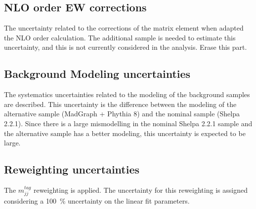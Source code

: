 \color{blue}
{
\subsection{NLO order EW corrections}
The uncertainty related to the corrections of the matrix element when adapted the NLO order calculation. The additional sample is needed to estimate this uncertainty, and this is not currently considered in the analysis. Erase this part.
}

\color{black}
\subsection{Background Modeling uncertainties}
The systematics uncertainties related to the modeling of the background samples are described. This uncertainty is the difference between the modeling of the alternative sample (MadGraph + Phythia 8)  and the nominal sample (Shelpa 2.2.1). Since there is a large mismodelling in the nominal Shelpa 2.2.1 sample and the alternative sample has a better modeling, this uncertainty is expected to be large.
\subsection{Reweighting uncertainties}
The $m^{tag}_{jj}$ reweighting is applied. The uncertainty for this reweighting is assigned considering a 100~\% uncertainty on the linear fit parameters. 

